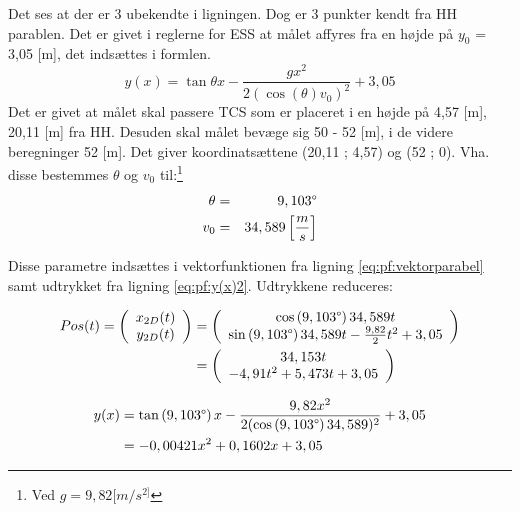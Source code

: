 Det ses at der er 3 ubekendte i ligningen. Dog er 3 punkter kendt fra HH parablen. Det er givet i reglerne for ESS at målet affyres fra en højde på \(y_0\) = 3,05 [m], det indsættes i formlen. 
\begin{equation}
y(x) = \tan \theta x - \frac{gx^2}{2(\cos \left( \theta \right)  v_0)^2} + 3,05
\label{eq:pf:y(x)2}
\end{equation}
Det er givet at målet skal passere TCS som er placeret i en højde på 4,57 [m], 20,11 [m] fra HH. 
Desuden skal målet bevæge sig 50 - 52 [m], i de videre beregninger 52 [m]. Det giver koordinatsættene (20,11 ; 4,57) og (52 ; 0). Vha. disse bestemmes \(\theta\) og \(v_0\) til:\footnote{Ved \(g = 9,82[m/{s}^{2]}\)}
\begin{eqnarray}
\theta &=& 9,103 \degree \\
v_0 &=& 34,589 \left[ \frac { m }{ s }  \right] 
\end{eqnarray}

Disse parametre indsættes i vektorfunktionen fra ligning \ref{eq:pf:vektorparabel} samt udtrykket fra ligning \ref{eq:pf:y(x)2}. Udtrykkene reduceres: 

\begin{align}
\begin{split}
	Pos(t) = \left( \begin{array}{c}
	x_{2D}(t) \\
	y_{2D}(t)
	\end{array}
	\right)
	&= \left( \begin{array}{c}
	\cos \left(9,103 \degree \right) 34,589 t \\
	\sin \left(9,103 \degree \right) 34,589 t - \frac{9,82}{2} t^2 + 3,05
	\end{array}
	\right) \\
	&= \left( \begin{array}{c}
	34,153 t \\
	- 4,91 t^2 + 5,473 t + 3,05
	\end{array}
	\right)
\label{eq:pf:vektorparabel2}
\end{split}
\end{align}

\begin{align}
\begin{split}
y(x) &= \tan \left(9,103 \degree \right) x - \frac{9,82x^2}{2(\cos \left(9,103 \degree \right) 34,589)^2} + 3,05 \\
&= - 0,00421 x^2 + 0,1602 x  + 3,05
\label{eq:pf:y(x)3}
\end{split}
\end{align}

